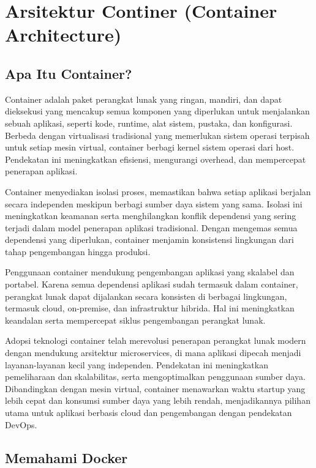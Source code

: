 
\chapter{Arsitektur Continer (Container Architecture)}

\section{Apa Itu Container?}

Container adalah paket perangkat lunak yang ringan, mandiri, dan dapat dieksekusi yang mencakup semua komponen yang diperlukan untuk menjalankan sebuah aplikasi, seperti kode, runtime, alat sistem, pustaka, dan konfigurasi. Berbeda dengan virtualisasi tradisional yang memerlukan sistem operasi terpisah untuk setiap mesin virtual, container berbagi kernel sistem operasi dari host. Pendekatan ini meningkatkan efisiensi, mengurangi overhead, dan mempercepat penerapan aplikasi.

Container menyediakan isolasi proses, memastikan bahwa setiap aplikasi berjalan secara independen meskipun berbagi sumber daya sistem yang sama. Isolasi ini meningkatkan keamanan serta menghilangkan konflik dependensi yang sering terjadi dalam model penerapan aplikasi tradisional. Dengan mengemas semua dependensi yang diperlukan, container menjamin konsistensi lingkungan dari tahap pengembangan hingga produksi.

Penggunaan container mendukung pengembangan aplikasi yang skalabel dan portabel. Karena semua dependensi aplikasi sudah termasuk dalam container, perangkat lunak dapat dijalankan secara konsisten di berbagai lingkungan, termasuk cloud, on-premise, dan infrastruktur hibrida. Hal ini meningkatkan keandalan serta mempercepat siklus pengembangan perangkat lunak.

Adopsi teknologi container telah merevolusi penerapan perangkat lunak modern dengan mendukung arsitektur microservices, di mana aplikasi dipecah menjadi layanan-layanan kecil yang independen. Pendekatan ini meningkatkan pemeliharaan dan skalabilitas, serta mengoptimalkan penggunaan sumber daya. Dibandingkan dengan mesin virtual, container menawarkan waktu startup yang lebih cepat dan konsumsi sumber daya yang lebih rendah, menjadikannya pilihan utama untuk aplikasi berbasis cloud dan pengembangan dengan pendekatan DevOps.

\section{Memahami Docker}

